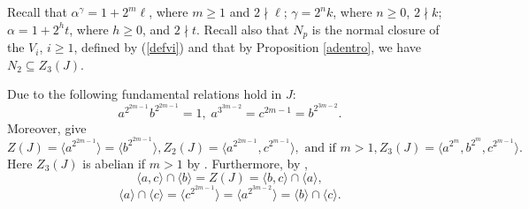 \documentclass{amsart}
\theoremstyle{definition}
\theoremstyle{remark}
\begin{document}
{Recall that $\alpha^\gamma=1+2^m\ell$, where $m\geq 1$ and $2\nmid \ell$;
$\gamma=2^n k$, where $n\geq 0$, $2\nmid k$; $\alpha=1+2^h t$, where $h\geq 0$, and $2\nmid t$. Recall also that
$N_p$ is the normal closure of the $V_i$, $i\geq 1$, defined by (\ref{defvi}) and that by Proposition \ref{adentro}, we have
$N_2\subseteq Z_3(J)$.



Due to \cite[Proposition 6.4]{MS} the following fundamental relations hold in $J$:
\begin{equation}
\label{funrel2}
a^{2^{2m-1}}b^{2^{2m-1}}=1,\; a^{3^{3m-2}}=c^{2m-1}=b^{2^{3m-2}}.
\end{equation}
Moreover, \cite[Theorem 8.1 and Proposition 8.2]{MS} give
\begin{equation}
\label{zjdos}
Z(J)=\langle a^{2^{2m-1}}\rangle=\langle b^{2^{2m-1}}\rangle, 
Z_2(J)=\langle a^{2^{2m-1}}, c^{2^{m-1}}\rangle,\text{ and if }m>1,
Z_3(J)=\langle a^{2^{m}}, b^{2^{m}}, c^{2^{m-1}}\rangle.
\end{equation}
Here $Z_3(J)$ is abelian if $m>1$ by \cite[Proposition 9.1]{MS}. Furthermore, by \cite[Proposition 7.2]{MS},
\begin{equation}
\label{inter12}
\langle a,c\rangle\cap \langle b\rangle=Z(J)=\langle b,c\rangle\cap \langle a\rangle,
\end{equation}
\begin{equation}
\label{inter22}
\langle a\rangle\cap \langle c\rangle=\langle c^{2^{2m-1}}\rangle=\langle a^{2^{3m-2}}\rangle=\langle b\rangle\cap \langle c\rangle.
\end{equation}

}
\end{document}
